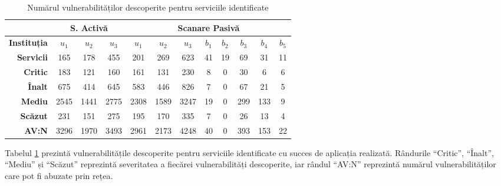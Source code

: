 	\begin{table}[H]
		\centering
		\begin{tabular}{r|ccc|ccc|ccccc|}
			\cline{2-12}
			\multicolumn{1}{l|}{}                         & \multicolumn{3}{c|}{\textbf{S. Activă}} & \multicolumn{8}{c|}{\textbf{Scanare Pasivă}}                                                             \\ \hline
			\multicolumn{1}{|r|}{\textbf{Instituția}}      & \textbf{$u_1$}    & \textbf{$u_2$}    & \textbf{$u_3$}   & \textbf{$u_1$} & \textbf{$u_2$} & \textbf{$u_3$} & \textbf{$b_1$} & \textbf{$b_2$} & \textbf{$b_3$} & \textbf{$b_4$} & \textbf{$b_5$} \\
			\multicolumn{1}{|r|}{\textbf{Servicii}} & 165            & 178            & 455           & 201         & 269         & 623         & 41          & 19          & 69          & 31          & 11          \\ \hline
			\multicolumn{1}{|r|}{\textbf{Critic}}       & 183            & 121            & 160           & 161         & 131         & 230         & 8           & 0           & 30          & 6           & 6           \\
			\multicolumn{1}{|r|}{\textbf{Înalt}}          & 675            & 414            & 645           & 583         & 446         & 826         & 7           & 0           & 67          & 21          & 5           \\
			\multicolumn{1}{|r|}{\textbf{Mediu}}        & 2545           & 1441           & 2775          & 2308        & 1589        & 3247        & 19          & 0           & 299         & 133         & 9           \\
			\multicolumn{1}{|r|}{\textbf{Scăzut}}       & 231            & 151            & 275           & 195         & 170         & 335         & 7           & 0           & 26          & 13          & 4           \\
			\multicolumn{1}{|r|}{\textbf{AV:N}}           & 3296           & 1970           & 3493          & 2961        & 2173        & 4248        & 40          & 0           & 393         & 153         & 22          \\ \hline
		\end{tabular}
		\caption{Numărul vulnerabilităților descoperite pentru serviciile identificate}
		\label{cpevulns_ro}
	\end{table}
	
	Tabelul \ref{cpevulns_ro} prezintă vulnerabilitățile descoperite pentru serviciile identificate cu succes de aplicația realizată. Rândurile ``Critic'', ``Înalt'', ``Mediu'' și ``Scăzut'' reprezintă severitatea a fiecărei vulnerabilități descoperite, iar rândul ``AV:N'' reprezintă numărul vulnerabilităților care pot fi abuzate prin rețea.
	
